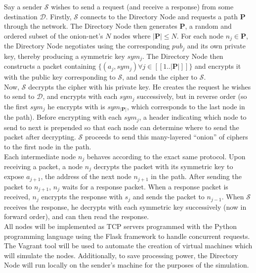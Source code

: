 \documentclass[10pt]{article}
\begin{document}
\noindent Say a sender $\mathcal{S}$ wishes to send a request (and receive a response)
from some destination $\mathcal{D}$.  Firstly, $\mathcal{S}$ connects to the Directory Node
and requests a path $\mathbf{P}$ through the network. The Directory Node then generates
$\mathbf{P}$, a random and ordered subset of the onion-net's $N$ nodes where $|\mathbf{P}| \leq N$.  For each node
$n_j \in \mathbf{P}$, the Directory Node negotiates using the corresponding
$pub_j$ and its own private key, thereby producing a symmetric key $sym_j$.  The Directory
Node then constructs a packet containing $\{(a_j, sym_j) \forall j \in [\![1..|\mathbf{P}|]\!]\}$ and
encrypts it with the public key corresponding to $\mathcal{S}$, and sends the cipher to $\mathcal{S}$.\\

\noindent Now, $\mathcal{S}$ decrypts the cipher with his private key. He creates the
request he wishes to send to $\mathcal{D}$, and encrypts with each $sym_j$
successively, but in reverse order (so the first $sym_j$ he encrypts with is $sym_{|\mathbf{P}|}$, which corresponds
to the last node in the path). Before encrypting with each $sym_j$, a header
indicating which node to send to next is prepended so that each node can
determine where to send the packet after decrypting. $\mathcal{S}$ proceeds to
send this many-layered ``onion'' of ciphers to the first node in the path.\\

\noindent Each intermediate node $n_j$ behaves according to the exact same protocol. Upon receiving
a packet, a node $n_j$ decrypts the packet with its symmetric key to expose $a_{j+1}$, the
address of the next node $n_{j+1}$ in the path.  After sending the packet to $n_{j+1}$, $n_j$
waits for a response packet.  When a response packet is received, $n_j$ encrypts the response with
$s_j$ and sends the packet to $n_{j-1}$.  When $\mathcal{S}$ receives the response, he decrypts
with each symmetric key successively (now in forward order), and can then read the response.\\

\noindent All nodes will be implemented as TCP servers programmed with the Python programming
language using the Flask framework to handle concurrent requests.  The Vagrant tool will be
used to automate the creation of virtual machines which will simulate the nodes.  Additionally,
to save processing power, the Directory Node will run locally on the sender's machine for the
purposes of the simulation.\\
\end{document}
